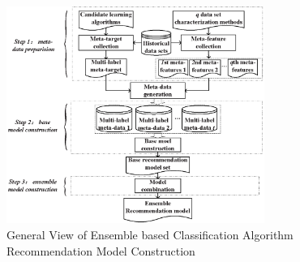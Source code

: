 \documentclass[acmsmall]{acmart}
\begin{document}
\begin{figure}
	\centering
	\includegraphics[width=0.75\textwidth]{Figures/MethodGeneralView3}
	\caption{General View of Ensemble based Classification Algorithm Recommendation Model Construction}\label{Fig:ModelConstructProcess}
\end{figure}
\end{document}

